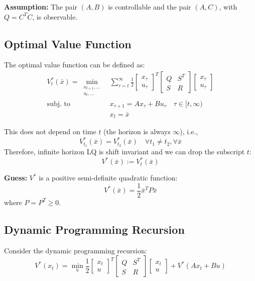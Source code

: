 \documentclass[openany]{book}
\theoremstyle{definition}
\theoremstyle{remark}
\begin{document}
\textbf{Assumption:} The pair $(A,B)$ is controllable and the pair $(A,C)$, with $Q=C^TC$, is observable.

\subsection{Optimal Value Function}
The optimal value function can be defined as:
\begin{align*}
V_t^*(\bar{x}) = \min_{\substack{x_{t+1},\dots\\u_t,\dots}} &\sum_{\tau=t}^{\infty} \frac{1}{2}\begin{bmatrix}
x_\tau \\ u_\tau
\end{bmatrix}^T \begin{bmatrix}
Q & S^T \\ S & R
\end{bmatrix} \begin{bmatrix}
x_\tau \\ u_\tau
\end{bmatrix}\\
\text{subj. to } & x_{\tau+1} = Ax_\tau + Bu_\tau \quad \tau \in [t,\infty)\\
&x_t = \bar{x}
\end{align*}

This does not depend on time $t$ (the horizon is always $\infty$), i.e.,
\[
V_{t_1}^*(\bar{x}) = V_{t_2}^*(\bar{x}) \quad \forall t_1 \neq t_2, \forall \bar{x}
\]
Therefore, infinite horizon LQ is shift invariant and we can drop the subscript $t$:
\[
V^*(\bar{x}) := V_t^*(\bar{x})
\]

\textbf{Guess:} $V^*$ is a positive semi-definite quadratic function:
\[
V^*(\bar{x}) = \frac{1}{2}\bar{x}^T P\bar{x}
\]
where $P = P^T \geq 0$.

\subsection{Dynamic Programming Recursion}
Consider the dynamic programming recursion:
\[
V^*(x_t) = \min_u \frac{1}{2}\begin{bmatrix}
x_t \\ u
\end{bmatrix}^T \begin{bmatrix}
Q & S^T \\ S & R
\end{bmatrix} \begin{bmatrix}
x_t \\ u
\end{bmatrix} + V^*(Ax_t + Bu)
\]
\end{document}
